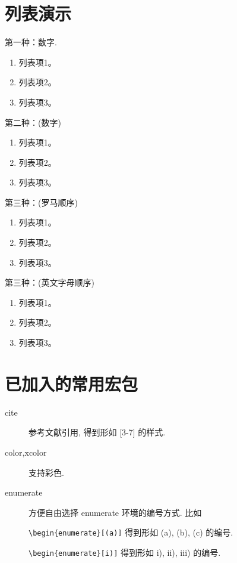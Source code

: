 \section{列表演示}

第一种：数字.

\begin{enumerate}[itemindent=2em]
	\item 列表项1。
	\item 列表项2。
	\item 列表项3。 
\end{enumerate}

第二种：(数字)

\begin{enumerate}[itemindent=2em,label=(\arabic*)]	
	\item 列表项1。
	\item 列表项2。
	\item 列表项3。 
\end{enumerate}

第三种：(罗马顺序)

\begin{enumerate}[itemindent=2em,label=(\roman*)]	
	\item 列表项1。
	\item 列表项2。
	\item 列表项3。 
\end{enumerate}

第三种：(英文字母顺序)

\begin{enumerate}[itemindent=2em,label=(\alph*)]	
	\item 列表项1。
	\item 列表项2。
	\item 列表项3。
\end{enumerate}

\section{已加入的常用宏包}

\begin{description}
  \item[cite]  参考文献引用, 得到形如 [3-7] 的样式.
  \item[color,xcolor]  支持彩色.
  \item[enumerate]  方便自由选择 enumerate 环境的编号方式. 比如

  \verb|\begin{enumerate}[(a)]| 得到形如 (a), (b), (c) 的编号.

  \verb|\begin{enumerate}[i)]| 得到形如 i), ii), iii) 的编号.

\end{description}


